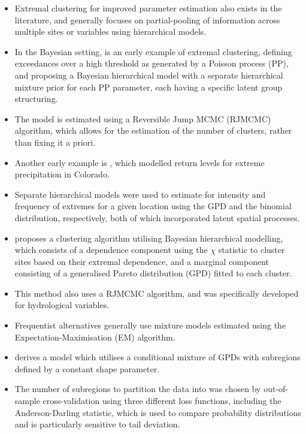 \documentclass{article}
\numberwithin{equation}{section}
\begin{document}
\begin{itemize}
  \item Extremal clustering for improved parameter estimation also exists in the literature, and generally focuses on partial-pooling of information across multiple sites or variables using hierarchical models.
  \item In the Bayesian setting, \citet{Bottolo2003} is an early example of extremal clustering, defining exceedances over a high threshold as generated by a Poisson process (PP), and proposing a Bayesian hierarchical model with a separate hierarchical mixture prior for each PP parameter, each having a specific latent group structuring.
  \item The model is estimated using a Reversible Jump MCMC (RJMCMC) algorithm, which allows for the estimation of the number of clusters, rather than fixing it a priori.
  \item Another early example is \citet{Cooley2007}, which modelled return levels for extreme precipitation in Colorado.
  \item Separate hierarchical models were used to estimate for intensity and frequency of extremes for a given location using the GPD and the binomial distribution, respectively, both of which incorporated  latent spatial processes.
  \item \cite{Rohrbeck2021} proposes a clustering algorithm utilising Bayesian hierarchical modelling, which consists of a dependence component using the $\chi$ statistic to cluster sites based on their extremal dependence, and a marginal component consisting of a generalised Pareto distribution (GPD) fitted to each cluster.
  \item This method also uses a RJMCMC algorithm, and was specifically developed for hydrological variables. 
  \item Frequentist alternatives generally use mixture models estimated using the Expectation-Maximisation (EM) algorithm.
  \item \citet{Carreau2017} derives a model which utilises a conditional mixture of GPDs with subregions defined by a constant shape parameter.
  \item The number of subregions to partition the data into was chosen by out-of-sample cross-validation using three different loss functions, including the Anderson-Darling statistic, which is used to compare probability distributions and is particularly sensitive to tail deviation.

\end{itemize}
\end{document}
